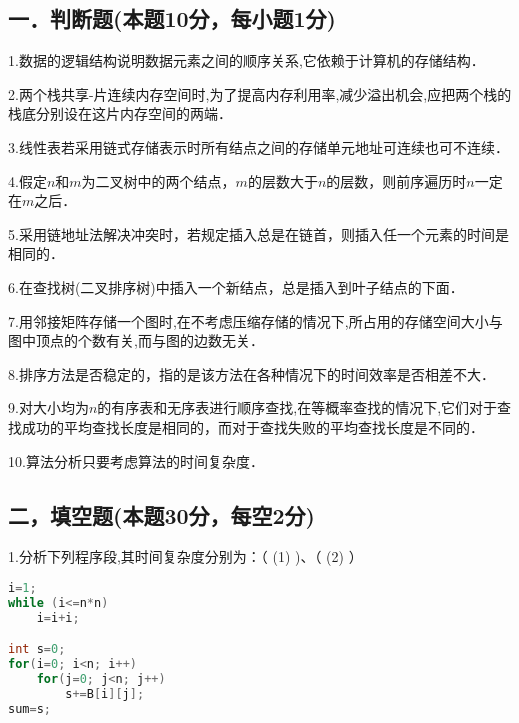 
\subsection{一．判断题(本题10分，每小题1分)}

1.数据的逻辑结构说明数据元素之间的顺序关系,它依赖于计算机的存储结构．

2.两个栈共享-片连续内存空间时,为了提高内存利用率,减少溢出机会,应把两个栈的栈底分别设在这片内存空间的两端．

3.线性表若采用链式存储表示时所有结点之间的存储单元地址可连续也可不连续．

4.假定$n$和$m$为二叉树中的两个结点，$m$的层数大于$n$的层数，则前序遍历时$n$一定在$m$之后．

5.采用链地址法解决冲突时，若规定插入总是在链首，则插入任一个元素的时间是相同的．

6.在查找树(二叉排序树)中插入一个新结点，总是插入到叶子结点的下面．

7.用邻接矩阵存储一个图时,在不考虑压缩存储的情况下,所占用的存储空间大小与图中顶点的个数有关,而与图的边数无关．

8.排序方法是否稳定的，指的是该方法在各种情况下的时间效率是否相差不大．

9.对大小均为$n$的有序表和无序表进行顺序查找,在等概率查找的情况下,它们对于查找成功的平均查找长度是相同的，而对于查找失败的平均查找长度是不同的．

10.算法分析只要考虑算法的时间复杂度．

\subsection{二，填空题(本题30分，每空2分)}

1.分析下列程序段,其时间复杂度分别为：（ (1) )、（ (2) ）
\begin{lstlisting}[language=cpp]
i=1;
while (i<=n*n)
    i=i+i;

int s=0;
for(i=0; i<n; i++)
    for(j=0; j<n; j++)
        s+=B[i][j];
sum=s;
\end{lstlisting}

